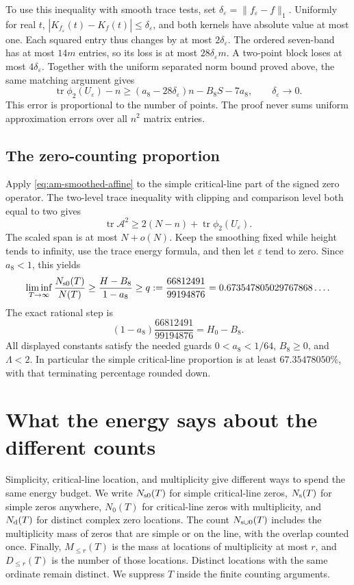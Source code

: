 \documentclass[11pt,reqno]{amsart}
\numberwithin{equation}{section}
\begin{document}
To use this inequality with smooth trace tests, set
$\delta_\varepsilon=\|f_\varepsilon-f\|_1$. Uniformly for real $t$,
$|K_{f_\varepsilon}(t)-K_f(t)|\le\delta_\varepsilon$, and both kernels
have absolute value at most one. Each squared entry thus changes by
at most $2\delta_\varepsilon$. The ordered seven-band has at most
$14m$ entries, so its loss is at most $28\delta_\varepsilon m$.
A two-point block loses at most $4\delta_\varepsilon$.
Together with the uniform separated norm bound proved above, the
same matching argument gives
\begin{equation}
 \operatorname{tr}\phi_2(U_\varepsilon)-n
 \ge(a_8-28\delta_\varepsilon)n-B_8S-7a_8,
 \qquad\delta_\varepsilon\longrightarrow0.
 \label{eq:am-smoothed-affine}
\end{equation}
This error is proportional to the number of points. The proof never
sums uniform approximation errors over all $n^2$ matrix entries.

\subsection{The zero-counting proportion}

Apply \eqref{eq:am-smoothed-affine} to the simple critical-line part
of the signed zero operator. The two-level trace inequality with
clipping and comparison level both equal to two gives
\[
 \operatorname{tr}\mathcal A^2
 \ge2(N-n)+\operatorname{tr}\phi_2(U_\varepsilon).
\]
The scaled span is at most $N+o(N)$. Keep the smoothing fixed while
height tends to infinity, use the trace energy formula, and then let
$\varepsilon$ tend to zero. Since $a_8<1$, this yields
\begin{equation}
 \liminf_{T\to\infty}\frac{N_{\rm s0}(T)}{N(T)}
 \ge\frac{H-B_8}{1-a_8}
 \ge q:=\frac{66812491}{99194876}
 =0.673547805029767868\ldots.
 \label{eq:am-proportion}
\end{equation}
The exact rational step is
\[
 (1-a_8)\frac{66812491}{99194876}=H_0-B_8.
\]
All displayed constants satisfy the needed guards
$0<a_8<1/64$, $B_8\ge0$, and $\Lambda<2$.
In particular the simple critical-line proportion is at least
$67.35478050\%$, with that terminating percentage rounded down.


\section{What the energy says about the different counts}
\label{sec:plus-counts}

Simplicity, critical-line location, and multiplicity give different ways
to spend the same energy budget. We write $N_{\rm s0}(T)$ for simple
critical-line zeros, $N_{\rm s}(T)$ for simple zeros anywhere,
$N_0(T)$ for critical-line zeros with multiplicity, and $N_{\rm d}(T)$
for distinct complex zero locations. The count $N_{\rm s\cup0}(T)$
includes the multiplicity mass of zeros that are simple or on the line,
with the overlap counted once. Finally, $M_{\le r}(T)$ is the mass
at locations of multiplicity at most $r$, and $D_{\le r}(T)$ is the
number of those locations. Distinct locations with the same ordinate
remain distinct. We suppress $T$ inside the finite counting arguments.
\end{document}
